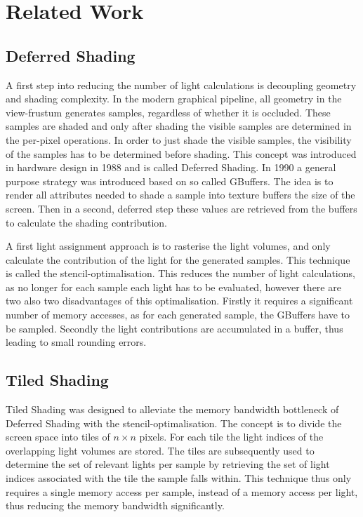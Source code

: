 \section{Related Work}

\subsection{Deferred Shading}

A first step into reducing the number of light calculations is decoupling
geometry and shading complexity. In the modern graphical pipeline, all geometry
in the view-frustum generates samples, regardless of whether it is occluded.
These samples are shaded and only after shading the visible samples are
determined in the per-pixel operations. In order to just shade the visible
samples, the visibility of the samples has to be determined before shading.
This concept was introduced in hardware design in 1988\cite{} and is called
Deferred Shading. In 1990 a general purpose strategy was introduced based on so
called GBuffers\cite{}. The idea is to render all attributes needed to shade a
sample into texture buffers the size of the screen. Then in a second, deferred
step these values are retrieved from the buffers to calculate the shading
contribution.

A first light assignment approach is to rasterise the light volumes, and
only calculate the contribution of the light for the generated samples.
This technique is called the stencil-optimalisation\cite{}. This reduces
the number of light calculations, as no longer for each sample each light
has to be evaluated, however there are two also two disadvantages of this
optimalisation. Firstly it requires a significant number of memory
accesses, as for each generated sample, the GBuffers have to be sampled.
Secondly the light contributions are accumulated in a buffer, thus leading
to small rounding errors.

\subsection{Tiled Shading}

Tiled Shading was designed to alleviate the memory bandwidth bottleneck of
Deferred Shading with the stencil-optimalisation. The concept is to divide
the screen space into tiles of $\mathit{n} \times \mathit{n}$ pixels. For
each tile the light indices of the overlapping light volumes are stored.
The tiles are subsequently used to determine the set of relevant lights per
sample by retrieving the set of light indices associated with the tile the
sample falls within. This technique thus only requires a single memory access
per sample, instead of a memory access per light, thus reducing the memory
bandwidth significantly.

